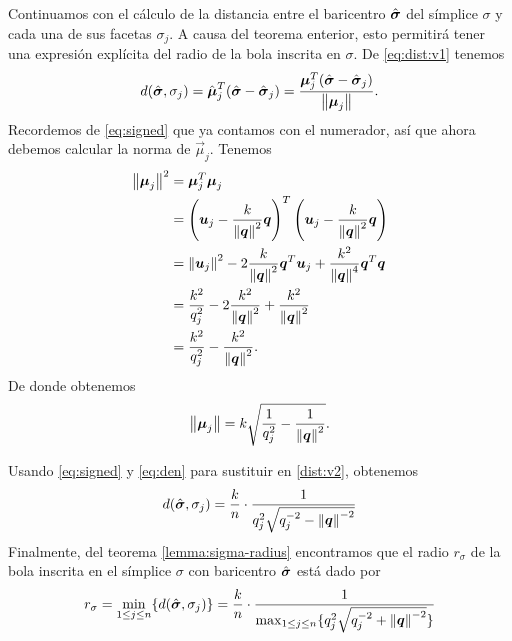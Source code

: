 Continuamos con el cálculo de la distancia entre el baricentro $\hat{\boldsymbol{ \sigma }}$ del símplice $\sigma$
y cada una de sus facetas $\sigma_j$. A causa del teorema enterior, esto permitirá tener una
expresión explícita del radio de la bola inscrita en $\sigma$. De \eqref{eq:dist:v1} tenemos
\begin{equation}
	\label{dist:v2}
	d(\hat{\boldsymbol{ \sigma }}, \sigma_j) = \hat{\boldsymbol{\mu}}_j^T(\hat{\boldsymbol{ \sigma }} - \hat{\boldsymbol{ \sigma }}_j)
	= \frac{\boldsymbol{\mu}_j^T(\hat{\boldsymbol{ \sigma }} - \hat{\boldsymbol{ \sigma }}_j)}{\left\lVert \boldsymbol{\mu}_j \right\rVert}.
\end{equation}
Recordemos de \eqref{eq:signed} que ya contamos con el numerador, así que ahora debemos calcular la
norma de $\vec{\mu}_j$. Tenemos
\begin{align*}
	\left\lVert \boldsymbol{\mu}_j \right\rVert^2
	&= \boldsymbol{\mu}_j^T\boldsymbol{\mu}_j \\
	&=
	\left(\boldsymbol{u}_j - \frac{k}{\left\lVert \boldsymbol{q} \right\rVert^2}\boldsymbol{q}\right)^T
	\left(\boldsymbol{u}_j - \frac{k}{\left\lVert \boldsymbol{q} \right\rVert^2}\boldsymbol{q}\right) \\
	&=
	\left\lVert \boldsymbol{u}_j \right\rVert^2 - 2\frac{k}{\left\lVert \boldsymbol{q} \right\rVert^2}\boldsymbol{q}^T\boldsymbol{u}_j +
	\frac{k^2}{\left\lVert \boldsymbol{q} \right\rVert^4}\boldsymbol{q}^T\boldsymbol{q} \\
	&= \frac{k^2}{q_j^2} - 2\frac{k^2}{\left\lVert \boldsymbol{q} \right\rVert^2} + \frac{k^2}{\left\lVert \boldsymbol{q} \right\rVert^2} \\
	&= \frac{k^2}{q_j^2} - \frac{k^2}{\left\lVert \boldsymbol{q} \right\rVert^2}.
\end{align*}
De donde obtenemos
\begin{equation}
	\label{eq:den}
	\left\lVert \boldsymbol{\mu}_j \right\rVert = k\sqrt{\frac{1}{q_j^2} - \frac{1}{\left\lVert \boldsymbol{q} \right\rVert^2}}.
\end{equation}

Usando \eqref{eq:signed} y \eqref{eq:den} para sustituir en \eqref{dist:v2}, obtenemos
\begin{equation*}
	d(\hat{\boldsymbol{ \sigma }}, \sigma_j) = \frac{k}{n} \cdot
	\frac{1}{q_j^2\sqrt{q_j^{-2} - \left\lVert \boldsymbol{q} \right\rVert^{-2}}}
\end{equation*}
Finalmente, del teorema \ref{lemma:sigma-radius} encontramos que el radio $r_\sigma$ de la bola
inscrita en el símplice $\sigma$ con baricentro $\hat{\boldsymbol{ \sigma }}$ está dado por
\begin{equation}
	\label{eq:sigma-radius}
	r_\sigma = \min_{1 \leq j \leq n} \lbrace d(\hat{\boldsymbol{ \sigma }}, \sigma_j) \rbrace = \frac{k}{n} \cdot
	\frac{1}{\max_{1 \leq j \leq n} \lbrace  q_j^2\sqrt{q_j^{-2} + \left\lVert \boldsymbol{q} \right\rVert^{-2}} \rbrace}
\end{equation}

